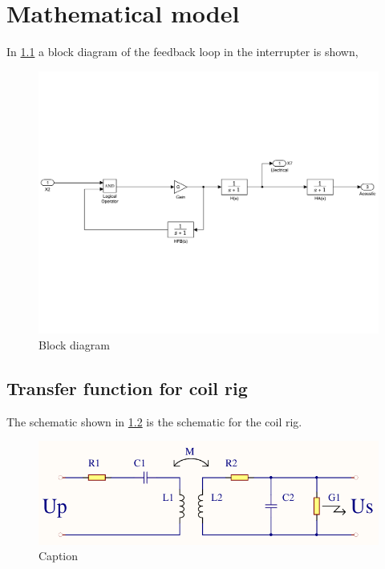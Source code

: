 \chapter{Mathematical model}

In \cref{fig:simulink} a block diagram of the feedback loop in the interrupter is shown, 

\begin{figure}[h!]
    \centering
    \includegraphics[width=\textwidth]{img/Simulink.pdf}
    \caption{Block diagram}
    \label{fig:simulink}
\end{figure}


\newpage
\section{Transfer function for coil rig}

The schematic shown in \cref{fig:spolerigg1} is the schematic for the coil rig.

\begin{figure}[h!]
    \centering
    \includegraphics[width=\textwidth]{Skjema/Spolerigg1.pdf}
    \caption{Caption}
    \label{fig:spolerigg1}
\end{figure}


